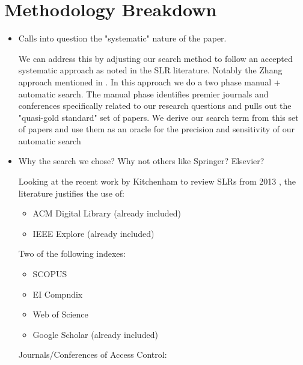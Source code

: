 \section{Methodology Breakdown}

\begin{itemize}

\item Calls into question the "systematic" nature of the paper.

We can address this by adjusting our search method to follow an accepted systematic approach as noted in the SLR literature. Notably the Zhang \cite{zhang2011identifying} approach mentioned in \cite{kitchenham2013systematic}. 
In this approach we do a two phase manual + automatic search. 
The manual phase identifies premier journals and conferences specifically related to our research questions and pulls out the "quasi-gold standard" set of papers.
We derive our search term from this set of papers and use them as an oracle for the precision and sensitivity of our automatic search

\item Why the search we chose? Why not others like Springer? Elsevier?

Looking at the recent work by Kitchenham to review SLRs from 2013 \cite{kitchenham2013systematic}, the literature justifies the use of: 

  \begin{itemize}
    \item ACM Digital Library (already included)
    \item IEEE Explore (already included)
  \end{itemize}

Two of the following indexes:
  \begin{itemize}
    \item SCOPUS
    \item EI Compndix
    \item Web of Science
    \item Google Scholar (already included)
  \end{itemize}

Journals/Conferences of Access Control:


\end{itemize}
